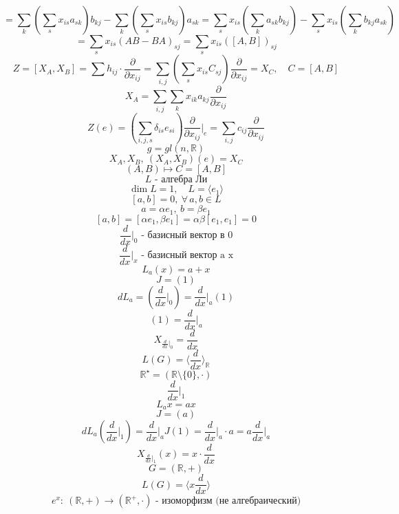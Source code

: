 \documentclass[a4paper]{article}
\theoremstyle{definition}
\theoremstyle{remark}
\begin{document}
\[
    = \sum_{k} \left( \sum_{s} x_{is} a_{sk} \right) b_{kj} -
    \sum_{k} \left( \sum_{s} x_{is} b_{kj} \right) a_{sk} 
    = \sum_{s} x_{is} \left(\sum_{k} a_{sk} b_{kj}\right) - \sum_{s} x_{is}
    \left(\sum_{k} b_{kj}a_{sk}\right)
\]
\[
    = \sum_{s} x_{is}(AB-BA)_{sj} = \sum_{s} x_{is}([A,B])_{sj}
\]
\[
    Z = [X_A, X_B] = \sum h_{ij} \cdot \frac{\partial}{\partial x_{ij}} 
    = \sum_{i,j} \left( \sum_{s} x_{is} C_{sj}\right) \frac{\partial}{\partial x_{ij}}
    = X_C
    , \quad C = [A,B]
\]
\[
    X_A = 
    \sum_{i,j} \sum_{k} x_{ik}a_{kj} \frac{\partial}{\partial x_{ij}}
\]
\[
    Z(e) = \left( \sum_{i,j,s} \delta_{is} e_{si}\right) \frac{\partial}{\partial x_{ij}} 
    \Bigg|_e = \sum_{i,j} c_{ij}\frac{\partial}{\partial x_{ij}} 
\]
\[
    g = gl(n, \mathbb{R})
\]
\[
    X_A, X_B, \ (X_A, X_B)(e) = X_C
\]
\[
    (A,B) \mapsto C = [A,B]
\]
\[
    L \text{ - алгебра Ли}
\]
\[
    \dim L = 1, \quad L = \langle e_1 \rangle
\]
\[
    [a,b] = 0, \ \forall \, a,b \in L
\]
\[
    a = \alpha e_1, \ b = \beta e_1
\]
\[
    [a,b] = [\alpha e_1, \beta e_1] = \alpha \beta [e_1, e_1] = 0
\]
\[
    \frac{d}{dx} \bigg|_0 \text{ - базисный вектор в 0}
\]
\[
    \frac{d}{dx} \bigg|_x \text{ - базисный вектор a x}
\]
\[
    L_a(x) = a+x
\]
\[
    J = (1)
\]
\[
    dL_a = \left( \frac{d}{dx} \bigg|_0 \right) = \frac{d}{dx} \bigg|_a
    (1)
\]
\[
    (1) = \frac{d}{dx} \bigg|_a
\]
\[
    X_{\frac{d}{dx} \big|_0} = \frac{d}{dx} 
\]
\[
    L(G) = \langle \frac{d}{dx} \rangle_{\mathbb{R}}
\]
\[
    \mathbb{R}^{\star} = (\mathbb{R} \setminus \{ 0 \}, \cdot)
\]
\[
    \frac{d}{dx} \bigg|_1
\]
\[
    L_a x =  ax
\]
\[
    J = (a)
\]
\[
    dL_a\left( \frac{d}{dx} \bigg|_1\right) = \frac{d}{dx} \bigg|_a J(1) = 
    \frac{d}{dx} \bigg|_a \cdot a = a \frac{d}{dx} \bigg|_a
\]
\[
    X_{\frac{d}{dx} \big|_1}(x) = x \cdot \frac{d}{dx} 
\]
\[
    G = (\mathbb{R}, +)
\]
\[
    L(G) = \langle x \frac{d}{dx} \rangle
\]
\[
    e^x: \ (\mathbb{R}, +) \to (\mathbb{R}^+, \cdot) \text{ - изоморфизм (не 
    алгебраический)}
\]
\end{document}
